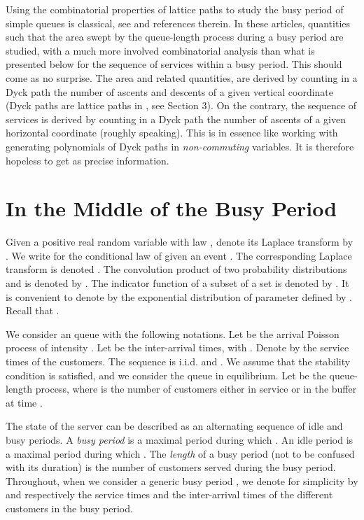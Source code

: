 \documentclass[11pt,a4paper]{article}
\numberwithin{equation}{section}
\newcommand{\1}{\mathbbm{1}}
\begin{document}
Using the combinatorial properties of lattice paths to study the busy period of simple queues is classical,
see \cite{Flajolet,Guillemin, taka2} and references therein.
In these articles, quantities such that the area swept by the queue-length process during a busy period are studied, with a much more involved
combinatorial analysis than what is presented below for the sequence of services within a busy period. This should come as no surprise.
The area and related quantities, are derived by counting in a Dyck path the number of ascents and descents of a given vertical coordinate
(Dyck paths are lattice paths in , see Section 3). On the contrary, the sequence of services is derived by counting in a Dyck path
the number of ascents of a given horizontal coordinate (roughly speaking). This is in essence like working with generating polynomials of Dyck paths in
{\em non-commuting} variables. It is therefore hopeless to get as precise information.


\section{In the Middle of the Busy Period}
Given a positive real random variable  with law , denote its Laplace transform by
.
We write   for the conditional
law of  given an event . The corresponding Laplace transform
is denoted . The convolution product of two probability distributions  and  is denoted by
. The
indicator function of a subset  of a set is denoted by .
It is convenient to denote by  the exponential
distribution of parameter  defined by .
Recall that .

\medskip

We consider an  queue with the following notations.
Let  be the arrival Poisson process of intensity
. Let  be the inter-arrival times, with
. Denote by  the service
times of the customers. The sequence  is
i.i.d. and .
We assume that the stability condition  is satisfied,
and we consider the queue in equilibrium. Let  be the
queue-length process, where  is the number of customers either in
service or in the buffer at time .


The state of the server can be described as an alternating sequence of
idle and busy periods. A {\em busy period}
is a maximal period during which . An idle period is a maximal
period during which .
The {\em length}  of a busy period  (not to be confused with its
duration) is the number of customers served during the busy period.
Throughout, when we consider a generic busy period , we denote for
simplicity by  and  respectively the service times and the inter-arrival
times of the different customers in the busy period.
\end{document}
